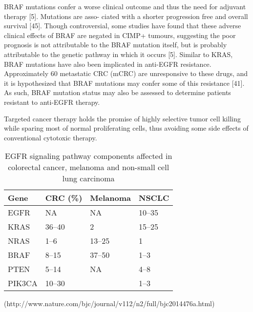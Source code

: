       BRAF mutations confer a worse clinical outcome and thus the need for
      adjuvant therapy [5]. Mutations are asso- ciated with a shorter
      progression free and overall survival [45]. Though controversial, some
      studies have found that these adverse clinical effects of BRAF are negated
      in CIMP+ tumours, suggesting the poor prognosis is not attributable to the
      BRAF mutation itself, but is probably attributable to the genetic pathway
      in which it occurs [5]. Similar to KRAS, BRAF mutations have also been
      implicated in anti-EGFR resistance. Approximately 60%
      metastatic CRC (mCRC) are unresponsive to these drugs, and it is
      hypothesized that BRAF mutations may confer some of this resistance [41].
      As such, BRAF mutation status may also be assessed to determine patients
      resistant to anti-EGFR therapy.

      Targeted cancer therapy holds the promise of highly selective
      tumor cell killing while sparing most of normal proliferating cells,
      thus avoiding some side effects of conventional cytotoxic therapy.

    \begin{table}[!htbp]
        \caption[Occurrence of mutations]{EGFR signaling pathway components affected in colorectal cancer, melanoma and non-small cell lung carcinoma}
        \centering
        \begin{tabular}{ |p{2cm}|p{2cm}|p{2cm}|p{2cm}|}
        \hline
        Gene & CRC (\%) & Melanoma & NSCLC \\ \hline \hline
        EGFR & NA & NA & 10--35 \\
        KRAS & 36--40 & 2 & 15--25 \\
        NRAS & 1--6 & 13--25 & 1 \\
        BRAF & 8--15 & 37--50 & 1--3 \\
        PTEN & 5--14 & NA & 4--8 \\
        PIK3CA & 10--30 & & 1--3 \\
        \hline
      \end{tabular}
    \end{table}
(http://www.nature.com/bjc/journal/v112/n2/full/bjc2014476a.html)


